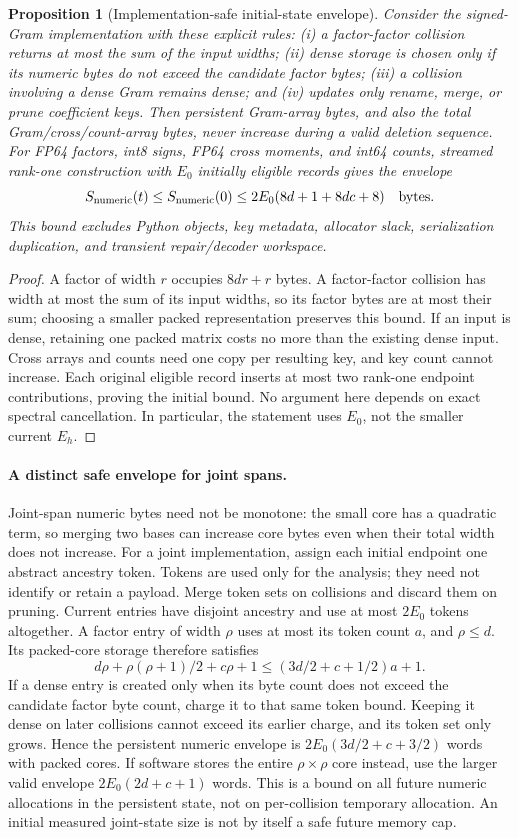 \documentclass[11pt,a4paper]{article}
\newtheorem{proposition}[theorem]{Proposition}
\begin{document}
\begin{proposition}[Implementation-safe initial-state envelope]
Consider the signed-Gram implementation with these explicit rules:
(i) a factor-factor collision returns at most the sum of the input widths;
(ii) dense storage is chosen only if its numeric bytes do not exceed the
candidate factor bytes; (iii) a collision involving a dense Gram remains
dense; and (iv) updates only rename, merge, or prune coefficient keys.
Then persistent Gram-array bytes, and also the total Gram/cross/count-array
bytes, never increase during a valid deletion sequence. For FP64 factors,
int8 signs, FP64 cross moments, and int64 counts, streamed rank-one
construction with $E_0$ initially eligible records gives the envelope
\[
 S_{\rm numeric}(t)\le S_{\rm numeric}(0)
       \le 2E_0(8d+1+8dc+8)\quad\text{bytes}.
\]
This bound excludes Python objects, key metadata, allocator slack,
serialization duplication, and transient repair/decoder workspace.
\end{proposition}
\begin{proof}
A factor of width $r$ occupies $8dr+r$ bytes. A factor-factor collision has
width at most the sum of its input widths, so its factor bytes are at most
their sum; choosing a smaller packed representation preserves this bound.
If an input is dense, retaining one packed matrix costs no more than the
existing dense input. Cross arrays and counts need one copy per resulting
key, and key count cannot increase. Each original eligible record inserts
at most two rank-one endpoint contributions, proving the initial bound.
No argument here depends on exact spectral cancellation. In particular,
the statement uses $E_0$, not the smaller current $E_h$.
\end{proof}

\paragraph{A distinct safe envelope for joint spans.}
Joint-span numeric bytes need not be monotone: the small core has a
quadratic term, so merging two bases can increase core bytes even when their
total width does not increase. For a joint implementation, assign each
initial endpoint one abstract ancestry token. Tokens are used only for the
analysis; they need not identify or retain a payload. Merge token sets on
collisions and discard them on pruning. Current entries have disjoint
ancestry and use at most $2E_0$ tokens altogether. A factor entry of width
$\rho$ uses at most its token count $a$, and $\rho\le d$. Its packed-core
storage therefore satisfies
\[
 d\rho+\rho(\rho+1)/2+c\rho+1
 \le (3d/2+c+1/2)a+1.
\]
If a dense entry is created only when its byte count does not exceed the
candidate factor byte count, charge it to that same token bound. Keeping it
dense on later collisions cannot exceed its earlier charge, and its token
set only grows. Hence the persistent numeric envelope is
$2E_0(3d/2+c+3/2)$ words with packed cores. If software stores the entire
$\rho\times\rho$ core instead, use the larger valid envelope
$2E_0(2d+c+1)$ words. This is a bound on all future numeric allocations in
the persistent state, not on per-collision temporary allocation. An initial
measured joint-state size is not by itself a safe future memory cap.
\end{document}
